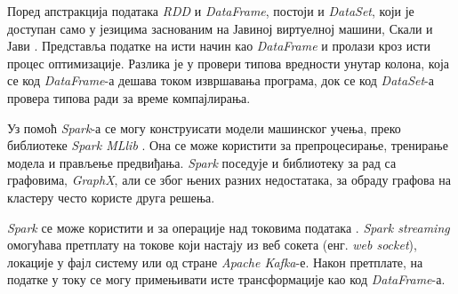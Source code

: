 \documentclass[12pt,oneside]{memoir}
\begin{document}
Поред апстракција података \textit{RDD} и \textit{DataFrame}, постоји и \textit{DataSet}, који је доступан само у језицима заснованим на Јавиној виртуелној машини, Скали и Јави \cite{spark_guide}. Представља податке на исти начин као \textit{DataFrame} и пролази кроз исти процес оптимизације. Разлика је у провери типова вредности унутар колона, која се код \textit{DataFrame}-а дешава током извршавања програма, док се код \textit{DataSet}-а провера типова ради за време компајлирања.

Уз помоћ \textit{Spark}-а се могу конструисати модели машинског учења, преко библиотеке \textit{Spark MLlib} \cite{spark_guide}. Она се може користити за препроцесирање, тренирање модела и прављење предвиђања. \textit{Spark} поседује и библиотеку за рад са графовима, \textit{GraphX}, али се због њених разних недостатака, за обраду графова на кластеру често користе друга решења.

\textit{Spark} се може користити и за операције над токовима података \cite{spark_streaming}. \textit{Spark streaming} омогућава претплату на токове који настају из веб сокета (енг. \textit{web socket}), локације у фајл систему или од стране \textit{Apache Kafka}-е. Након претплате, на податке у току се могу примењивати исте трансформације као код \textit{DataFrame}-а.

\end{document}
